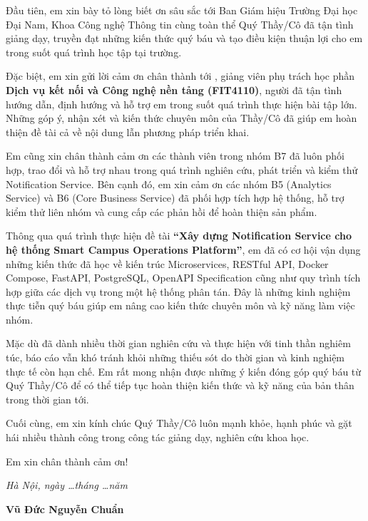 
Đầu tiên, em xin bày tỏ lòng biết ơn sâu sắc tới Ban Giám hiệu Trường Đại học Đại Nam, Khoa Công nghệ Thông tin cùng toàn thể Quý Thầy/Cô đã tận tình giảng dạy, truyền đạt những kiến thức quý báu và tạo điều kiện thuận lợi cho em trong suốt quá trình học tập tại trường.

Đặc biệt, em xin gửi lời cảm ơn chân thành tới \textbf{\GiangVienHD}, giảng viên phụ trách học phần \textbf{Dịch vụ kết nối và Công nghệ nền tảng (FIT4110)}, người đã tận tình hướng dẫn, định hướng và hỗ trợ em trong suốt quá trình thực hiện bài tập lớn. Những góp ý, nhận xét và kiến thức chuyên môn của Thầy/Cô đã giúp em hoàn thiện đề tài cả về nội dung lẫn phương pháp triển khai.

Em cũng xin chân thành cảm ơn các thành viên trong nhóm B7 đã luôn phối hợp, trao đổi và hỗ trợ nhau trong quá trình nghiên cứu, phát triển và kiểm thử Notification Service. Bên cạnh đó, em xin cảm ơn các nhóm B5 (Analytics Service) và B6 (Core Business Service) đã phối hợp tích hợp hệ thống, hỗ trợ kiểm thử liên nhóm và cung cấp các phản hồi để hoàn thiện sản phẩm.

Thông qua quá trình thực hiện đề tài \textbf{``Xây dựng Notification Service cho hệ thống Smart Campus Operations Platform''}, em đã có cơ hội vận dụng những kiến thức đã học về kiến trúc Microservices, RESTful API, Docker Compose, FastAPI, PostgreSQL, OpenAPI Specification cũng như quy trình tích hợp giữa các dịch vụ trong một hệ thống phân tán. Đây là những kinh nghiệm thực tiễn quý báu giúp em nâng cao kiến thức chuyên môn và kỹ năng làm việc nhóm.

Mặc dù đã dành nhiều thời gian nghiên cứu và thực hiện với tinh thần nghiêm túc, báo cáo vẫn khó tránh khỏi những thiếu sót do thời gian và kinh nghiệm thực tế còn hạn chế. Em rất mong nhận được những ý kiến đóng góp quý báu từ Quý Thầy/Cô để có thể tiếp tục hoàn thiện kiến thức và kỹ năng của bản thân trong thời gian tới.

Cuối cùng, em xin kính chúc Quý Thầy/Cô luôn mạnh khỏe, hạnh phúc và gặt hái nhiều thành công trong công tác giảng dạy, nghiên cứu khoa học.

Em xin chân thành cảm ơn!

\vspace{1cm}

\begin{flushright}
\begin{minipage}{8cm}
\centering
\textit{Hà Nội, ngày \ldots tháng \ldots năm \Nam}

\vspace{0.5cm}

\textbf{Vũ Đức Nguyễn Chuẩn}

\vspace{2cm}

\textbf{\TenSinhVien}
\end{minipage}
\end{flushright}

